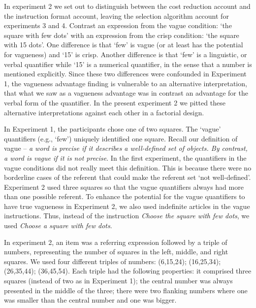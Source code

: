 \documentclass[graybox,envcountchap,sectrefs%
,footinfo
]{svmono}
\begin{document}
In experiment 2 we set out to distinguish between the cost reduction account and the instruction format account, leaving the selection algorithm account for experiments 3 and 4. Contrast an expression from the vague condition: `the square with few dots' with an expression from the crisp condition: `the square with 15 dots'. One difference is that `few' is vague (or at least has the potential for vagueness) and `15' is crisp. Another difference is that `few' is a linguistic, or verbal quantifier while `15' is a numerical quantifier, in the sense that a number is mentioned explicitly. Since these two differences were confounded in Experiment 1, the vagueness advantage finding is vulnerable to an alternative interpretation, that what we saw as a vagueness advantage was in contrast an advantage for the verbal form of the quantifier. In the present experiment 2 we pitted these alternative interpretations against each other in a factorial design. 

In Experiment 1, the participants chose one of two squares. The `vague' quantifiers (e.g., `few') uniquely identified one square. Recall our definition of vague  -- \emph{a word is precise if it describes a well-defined set of objects. By contrast, a word is vague if it is not precise}.  In the first experiment, the quantifiers in the vague conditions did not really meet this definition. This is because there were no borderline cases of the referent that could make the referent set `not well-defined'. Experiment 2 used three squares so that the vague quantifiers always had more than one possible referent. To enhance the potential for the vague quantifiers to have true vagueness in Experiment 2, we also used indefinite articles in the vague instructions. Thus, instead of the instruction \emph{Choose the square with few dots}, we used \emph{Choose a square with few dots}.

In experiment 2, an item was a referring expression followed by a triple of numbers, representing the number of squares in the left, middle, and right squares. We used four different triples of numbers: (6,15,24); (16,25,34); (26,35,44); (36,45,54). Each triple had the following properties: it comprised three squares (instead of two as in Experiment 1); the central number was always presented in the middle of the three; there were two flanking numbers where one was smaller than the central number and one was bigger. 
\end{document}
